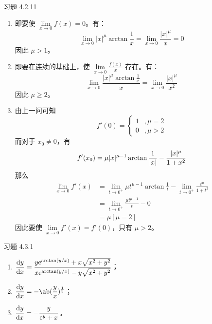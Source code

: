 \begin{problem}
	习题 4.2.11

	\begin{solution}
		\begin{enumerate}
			\item[\textbf{1)}] 即要使 $\lim\limits_{x \to 0} f(x) = 0$。有：
			$$
			\lim_{x \to 0} |x|^\mu \arctan \frac{1}{x} = \lim_{x \to 0} \frac{|x|^\mu}{x} = 0
			$$
			因此 $\mu > 1$。

			\item[\textbf{2)}] 即要在连续的基础上，使 $\lim\limits_{x \to 0} \frac{f(x)}{x}$ 存在。有：
			$$
			\lim_{x \to 0} \frac{|x|^\mu \arctan \frac{1}{x}}{x} = \lim_{x \to 0} \frac{|x|^\mu}{x^2}
			$$
			因此 $\mu \ge 2$。

			\item[\textbf{3)}] 由上一问可知
			$$
			f'(0) = \begin{cases}
				1 & , \mu = 2 \\
				0 & , \mu > 2
			\end{cases}
			$$
			而对于 $x_0 \neq 0$，有
			$$
			f'(x_0) = \mu |x|^{\mu - 1} \arctan \frac{1}{|x|} - \frac{|x|^{\mu}}{1 + x^2} \\
			$$
			那么
			$$
			\begin{aligned}
				\lim_{x \to 0} f'(x) & = \lim_{t \to 0^+} \mu t^{\mu - 1} \arctan \frac{1}{t} - \lim_{t \to 0^+} \frac{t^{\mu}}{1 + t^2} \\
				& = \lim_{t \to 0^+} \frac{\mu t^{\mu - 1}}{t} - 0 \\
				& = \mu [\mu=2]
			\end{aligned}
			$$
			因此要使 $\lim\limits_{x \to 0} f'(x) = f'(0)$，只有 $\mu > 2$。
		\end{enumerate}
	\end{solution}
\end{problem}

\begin{problem}
	习题 4.3.1

	\begin{solution}
		\begin{enumerate}
			\item[\textbf{1)}] $\displaystyle \dv{y}{x} = \frac{y \mathrm{e}^{\arctan(y/x)} + x \sqrt{x^2 + y^2}}{x \mathrm{e}^{\arctan(y/x)} - y \sqrt{x^2 + y^2}}$；
			\item[\textbf{3)}] $\displaystyle \dv{y}{x} = -\ab(\frac{y}{x})^{\frac{1}{3}}$；
			\item[\textbf{5)}] $\displaystyle \dv{y}{x} = -\frac{y}{\mathrm{e}^y + x}$。
		\end{enumerate}
	\end{solution}
\end{problem}

